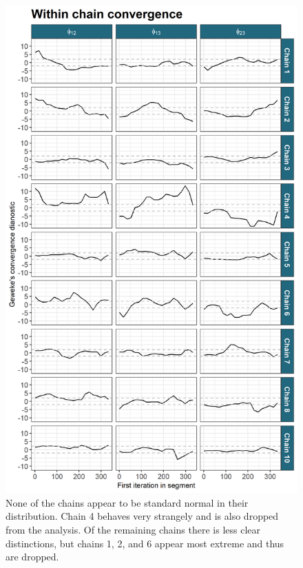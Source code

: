 \documentclass[]{article}
\begin{document}
\begin{figure}
	\centering
	\includegraphics[scale=0.75]{../Images/Yeast/Convergence/gewekePhiChain.png}
	\caption{None of the chains appear to be standard normal in their distribution. Chain 4 behaves very strangely and is also dropped from the analysis. Of the remaining chains there is less clear distinctions, but chains 1, 2, and 6 appear most extreme and thus are dropped.}
	\label{fig:gewekePhiPlot}
\end{figure}
\end{document}
